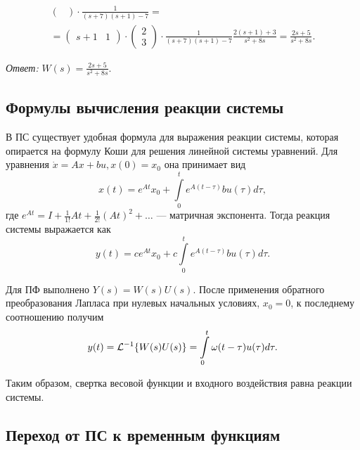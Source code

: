 \documentclass[../../TAU.tex]{subfiles}
\begin{document}
{\begin{multline*}
\begin{pmatrix}
            \end{pmatrix}
            \cdot
            \frac{1}{(s+7)(s+1)-7}
            =\\=
            \begin{pmatrix}
                s+1 & 1               
            \end{pmatrix}
            \cdot
            \begin{pmatrix}
                2 \\ 3              
            \end{pmatrix}
            \cdot
            \frac{1}{(s+7)(s+1)-7}
            \frac{2(s+1)+3}{s^2+8s}=
            \frac{2s+5}{s^2+8s}.
        \end{multline*}
            
        \textit{Ответ:} $W(s)=\frac{2s+5}{s^2+8s}.$
    }

\subsection{Формулы вычисления реакции системы}

    В ПС существует удобная формула для выражения реакции системы, которая опирается на формулу Коши для решения линейной системы уравнений. Для уравнения 
    $\dot x = Ax + bu, x(0) = x_0$ 
    она принимает вид
    $$
        x(t) = e^{At}x_0 + \int\limits_{0}^{t} e^{A(t-\tau)}bu(\tau)d\tau,
    $$
    где 
    $e^{At} = I+\frac{1}{1!}At + \frac{1}{2!}(At)^{2} + \ldots$ --- 
    матричная экспонента.
    Тогда реакция системы выражается как
    \begin{equation}\label{REACT}
        y(t) = ce^{At}x_0 + c\int\limits_{0}^{t} e^{A(t-\tau)}bu(\tau)d\tau.
    \end{equation}

    Для ПФ выполнено 
    $Y(s) = W(s)U(s)$. 
    После применения обратного преобразования Лапласа при нулевых начальных условиях, $x_0=0$, к последнему соотношению получим
    $$
        y(t) = \mathcal{L}^{-1}\{W(s)U(s)\} = \int\limits_{0}^t\omega(t-\tau)u(\tau)d\tau.
    $$

    Таким образом, свертка весовой функции и входного воздействия равна реакции системы.

\subsection{Переход от ПС к временным функциям}

\end{document}
